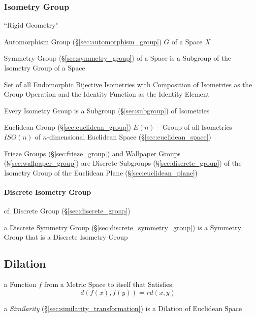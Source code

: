 \subsubsection{Isometry Group}\label{sec:isometry_group}

``Rigid Geometry''

Automorphism Group (\S\ref{sec:automorphism_group}) $G$ of a Space $X$

Symmetry Group (\S\ref{sec:symmetry_group}) of a Space is a Subgroup
of the Isometry Group of a Space %

Set of all Endomorphic Bijective Isometries with Composition of
Isometries as the Group Operation and the Identity Function as the
Identity Element

Every Isometry Group is a Subgroup (\S\ref{sec:subgroup}) of Isometries

Euclidean Group (\S\ref{sec:euclidean_group}) $E(n)$ -- Group of all
Isometries $ISO(n)$ of $n$-dimensional Euclidean Space
(\S\ref{sec:euclidean_space})

Frieze Groups (\S\ref{sec:frieze_group}) and Wallpaper Groups
(\S\ref{sec:wallpaper_group}) are Discrete Subgroups
(\S\ref{sec:discrete_group}) of the Isometry Group of the Euclidean Plane
(\S\ref{sec:euclidean_plane})



\paragraph{Discrete Isometry Group}\label{sec:discrete_isometry_group}\hfill

cf. Discrete Group (\S\ref{sec:discrete_group})

a Discrete Symmetry Group (\S\ref{sec:discrete_symmetry_group}) is a Symmetry
Group that is a Discrete Isometry Group



\subsection{Dilation}\label{sec:dilation}

a Function $f$ from a Metric Space to itself that Satisfies:
\[
  d(f(x), f(y)) = rd(x, y)
\]

a \emph{Similarity} (\S\ref{sec:similarity_transformation}) is a Dilation of
Euclidean Space

